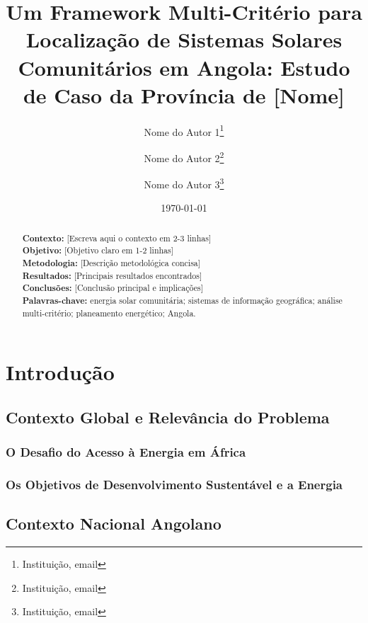 \documentclass[12pt, a4paper]{article}
\begin{document}
\title{Um Framework Multi-Critério para Localização de Sistemas Solares Comunitários em Angola: Estudo de Caso da Província de [Nome]}
\author{
    Nome do Autor 1\thanks{Instituição, email} \and 
    Nome do Autor 2\thanks{Instituição, email} \and 
    Nome do Autor 3\thanks{Instituição, email}
}
\date{\today}
\maketitle

\begin{abstract}
    \textbf{Contexto:} [Escreva aqui o contexto em 2-3 linhas] \\
    \textbf{Objetivo:} [Objetivo claro em 1-2 linhas] \\
    \textbf{Metodologia:} [Descrição metodológica concisa] \\
    \textbf{Resultados:} [Principais resultados encontrados] \\
    \textbf{Conclusões:} [Conclusão principal e implicações] \\
    \textbf{Palavras-chave:} energia solar comunitária; sistemas de informação geográfica; análise multi-critério; planeamento energético; Angola.
\end{abstract}

\newpage

\tableofcontents
\newpage

\section{Introdução}
\subsection{Contexto Global e Relevância do Problema}
\subsubsection{O Desafio do Acesso à Energia em África}
\subsubsection{Os Objetivos de Desenvolvimento Sustentável e a Energia}

\subsection{Contexto Nacional Angolano}
\end{document}
